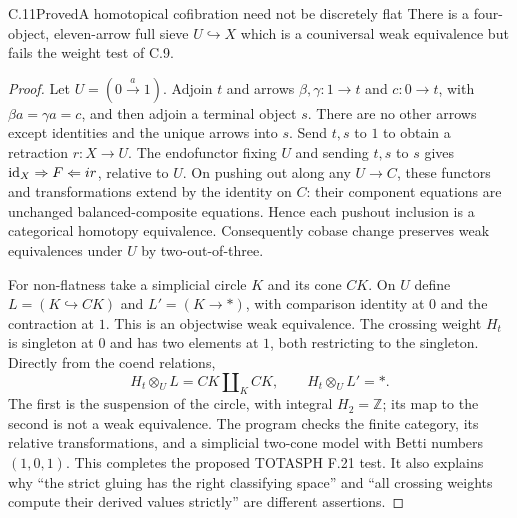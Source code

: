 \begin{statement}{C.11}{Proved}{A homotopical cofibration need not be discretely flat}
There is a four-object, eleven-arrow full sieve $U\hookrightarrow X$ which is a couniversal weak equivalence but fails the weight test of C.9.
\end{statement}
\begin{proof}
Let $U=(0\xrightarrow{a}1)$. Adjoin $t$ and arrows $\beta,\gamma:1\to t$ and $c:0\to t$, with $\beta a=\gamma a=c$, and then adjoin a terminal object $s$. There are no other arrows except identities and the unique arrows into $s$. Send $t,s$ to $1$ to obtain a retraction $r:X\to U$. The endofunctor fixing $U$ and sending $t,s$ to $s$ gives $\mathrm{id}_X\Rightarrow F\Leftarrow ir$, relative to $U$. On pushing out along any $U\to C$, these functors and transformations extend by the identity on $C$: their component equations are unchanged balanced-composite equations. Hence each pushout inclusion is a categorical homotopy equivalence. Consequently cobase change preserves weak equivalences under $U$ by two-out-of-three.

For non-flatness take a simplicial circle $K$ and its cone $CK$. On $U$ define $L=(K\hookrightarrow CK)$ and $L'=(K\to *)$, with comparison identity at $0$ and the contraction at $1$. This is an objectwise weak equivalence. The crossing weight $H_t$ is singleton at $0$ and has two elements at $1$, both restricting to the singleton. Directly from the coend relations,
\[
 H_t\otimes_U L=CK\amalg_K CK,
 \qquad H_t\otimes_U L'=*.
\]
The first is the suspension of the circle, with integral $H_2=\mathbb Z$; its map to the second is not a weak equivalence. The program checks the finite category, its relative transformations, and a simplicial two-cone model with Betti numbers $(1,0,1)$. This completes the proposed TOTASPH F.21 test. It also explains why ``the strict gluing has the right classifying space'' and ``all crossing weights compute their derived values strictly'' are different assertions.
\end{proof}
